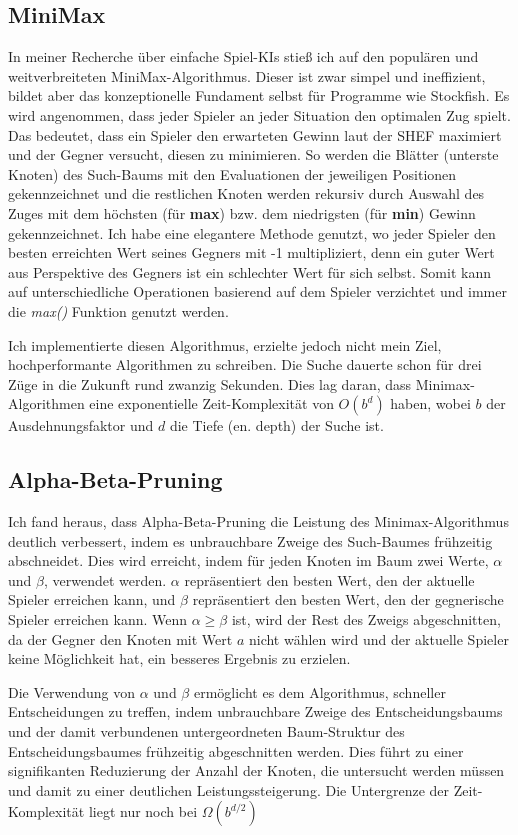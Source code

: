 \documentclass{jpp}
\begin{document}
\subsection{MiniMax}
In meiner Recherche über einfache Spiel-KIs stieß ich auf den populären und weitverbreiteten MiniMax-Algorithmus. Dieser ist zwar simpel und ineffizient, bildet aber das konzeptionelle Fundament selbst für Programme wie Stockfish.
Es wird angenommen, dass jeder Spieler an jeder Situation den optimalen Zug spielt. Das bedeutet, dass ein Spieler den erwarteten Gewinn laut der SHEF maximiert und der Gegner versucht, diesen zu minimieren. So werden die Blätter (unterste Knoten) des Such-Baums mit den Evaluationen der jeweiligen Positionen gekennzeichnet und die restlichen Knoten werden rekursiv durch Auswahl des Zuges mit dem höchsten (für \textbf{max}) bzw. dem niedrigsten (für \textbf{min}) Gewinn gekennzeichnet. Ich habe eine elegantere Methode genutzt, wo jeder Spieler den besten erreichten Wert seines Gegners mit -1 multipliziert, denn ein guter Wert aus Perspektive des Gegners ist ein schlechter Wert für sich selbst. Somit kann auf unterschiedliche Operationen basierend auf dem Spieler verzichtet und immer die \textit{max()} Funktion genutzt werden.

Ich implementierte diesen Algorithmus, erzielte jedoch nicht mein Ziel, hochperformante Algorithmen zu schreiben. Die Suche dauerte schon für drei Züge in die Zukunft rund zwanzig Sekunden. Dies lag daran, dass Minimax-Algorithmen eine exponentielle Zeit-Komplexität von $O(b^d)$ haben, wobei $b$ der Ausdehnungsfaktor und $d$ die Tiefe (en. depth) der Suche ist.

\subsection{Alpha-Beta-Pruning}
Ich fand heraus, dass Alpha-Beta-Pruning die Leistung des Minimax-Algorithmus deutlich verbessert, indem es unbrauchbare Zweige des Such-Baumes frühzeitig abschneidet. Dies wird erreicht, indem für jeden Knoten im Baum zwei Werte, $\alpha$ und $\beta$, verwendet werden. $\alpha$ repräsentiert den besten Wert, den der aktuelle Spieler erreichen kann, und $\beta$ repräsentiert den besten Wert, den der gegnerische Spieler erreichen kann. Wenn $\alpha \geq \beta$ ist, wird der Rest des Zweigs abgeschnitten, da der Gegner den Knoten mit Wert $a$ nicht wählen wird und der aktuelle Spieler keine Möglichkeit hat, ein besseres Ergebnis zu erzielen.

Die Verwendung von $\alpha$ und $\beta$ ermöglicht es dem Algorithmus, schneller Entscheidungen zu treffen, indem unbrauchbare Zweige des Entscheidungsbaums und der damit verbundenen untergeordneten Baum-Struktur des Entscheidungsbaumes frühzeitig abgeschnitten werden. Dies führt zu einer signifikanten Reduzierung der Anzahl der Knoten, die untersucht werden müssen und damit zu einer deutlichen Leistungssteigerung. Die Untergrenze der Zeit-Komplexität liegt nur noch bei $\Omega(b^{d/2})$
\end{document}
